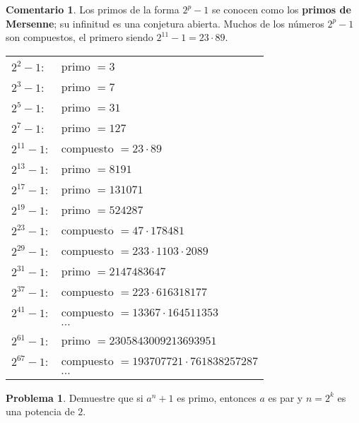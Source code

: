 \documentclass{article}
\theoremstyle{definition}
\newtheorem{problema}{Problema}
\newtheorem*{comentario}{Comentario}
\newenvironment{solucion}{\begin{proof}[Solución]\small}{\end{proof}}
\begin{document}
\begin{comentario}
  Los primos de la forma $2^p - 1$ se conocen como los
  \textbf{primos de Mersenne}; su infinitud es una conjetura abierta. Muchos de
  los números $2^p - 1$ son compuestos, el primero siendo
  $2^{11} - 1 = 23\cdot 89$.

  \begin{center}
    \begin{tabular}{ll}
      $2^2 - 1\colon$ & primo $= 3$ \\
      $2^3 - 1\colon$ & primo $= 7$ \\
      $2^5 - 1\colon$ & primo $= 31$ \\
      $2^7 - 1\colon$ & primo $= 127$ \\
      $2^{11} - 1\colon$ & compuesto $= 23\cdot 89$ \\
      $2^{13} - 1\colon$ & primo $= 8191$ \\
      $2^{17} - 1\colon$ & primo $= 131071$ \\
      $2^{19} - 1\colon$ & primo $= 524287$ \\
      $2^{23} - 1\colon$ & compuesto $= 47\cdot 178481$ \\
      $2^{29} - 1\colon$ & compuesto $= 233\cdot 1103\cdot 2089$ \\
      $2^{31} - 1\colon$ & primo $= 2147483647$ \\
      $2^{37} - 1\colon$ & compuesto $= 223\cdot 616318177$ \\
      $2^{41} - 1\colon$ & compuesto $= 13367\cdot 164511353$ \\
                      & $\cdots$ \\
      $2^{61} - 1\colon$ & primo $= 2305843009213693951$ \\
      $2^{67} - 1\colon$ & compuesto $= 193707721\cdot 761838257287$ \\
                      & $\cdots$
    \end{tabular}
  \end{center}
\end{comentario}

\begin{problema}
  Demuestre que si $a^n + 1$ es primo, entonces $a$ es par y $n = 2^k$ es
  una potencia de $2$.

\end{problema}
\end{document}
